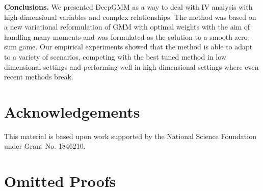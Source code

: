 \documentclass{article}
\theoremstyle{plain}
\theoremstyle{definition}
\begin{document}
\textbf{Conclusions.} We presented DeepGMM as a way to deal with IV analysis with high-dimensional variables and complex relationships. The method was based on a new variational reformulation of GMM with optimal weights with the aim of handling many moments and was formulated as the solution to a smooth zero-sum game. Our empirical experiments showed that the method is able to adapt to a variety of scenarios, competing with the best tuned method in low dimensional settings and performing well in high dimensional settings where even recent methods break.


%
%

%
%
%
%

%
%
%
%

%

%
%
%
%
%
%
%
%
%
%
%
%
%
%
%
%

%

%

%

%
%

%
%
%
%
%
%
%
%
%
%
%
%
%

%

%

%

\section*{Acknowledgements}
This material is based upon work supported by the National Science Foundation under Grant No. 1846210.

\newpage




\clearpage

\appendix

\section{Omitted Proofs}
\end{document}
